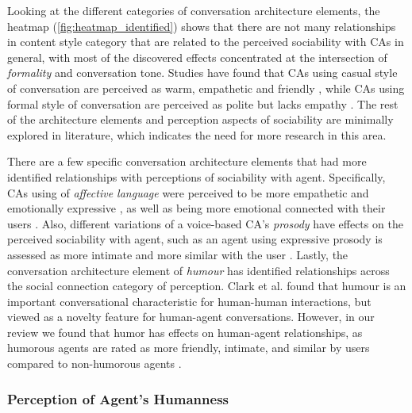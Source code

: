 Looking at the different categories of conversation architecture elements, the heatmap (\autoref{fig:heatmap_identified}) shows that there are not many relationships in content style category that are related to the perceived sociability with CAs in general, with most of the discovered effects concentrated at the intersection of \textit{formality} and conversation tone. Studies have found that CAs using casual style of conversation are perceived as warm, empathetic and friendly \cite{jestin2022effects, kim2019comparing}\cmt{[81][89]}, while CAs using formal style of conversation are perceived as polite but lacks empathy \cite{cox2022does}\cmt{[27]}. The rest of the architecture elements and perception aspects of sociability are minimally explored in literature, which indicates the need for more research in this area.

There are a few specific conversation architecture elements that had more identified relationships with perceptions of sociability with agent. Specifically, CAs using of \textit{affective language} were perceived to be more empathetic \cite{daher2020empathic, diederich2019emulating, yang2017perceived}\cmt{[58][25][44]} and emotionally expressive \cite{zhu2022effects}\cmt{[26]}, as well as being more emotional connected with their users \cite{lee2019s, lubis2019positive}\cmt{[55][43]}. Also, different variations of a voice-based CA's \textit{prosody} have effects on the perceived sociability with agent, such as an agent using expressive prosody is assessed as more intimate and more similar with the user \cite{kim2020can}\cmt{[24]}. Lastly, the conversation architecture element of \textit{humour} has identified relationships across the social connection category of perception. Clark et al. \cite{clark2019makes} found that humour is an important conversational characteristic for human-human interactions, but viewed as a novelty feature for human-agent conversations. However, in our review we found that humor has effects on human-agent relationships, as humorous agents are rated as more friendly, intimate, and similar by users compared to non-humorous agents \cite{go2021conversational, khooshabeh2011does}\cmt{[80][37]}. 


\subsubsection{Perception of Agent's Humanness}

